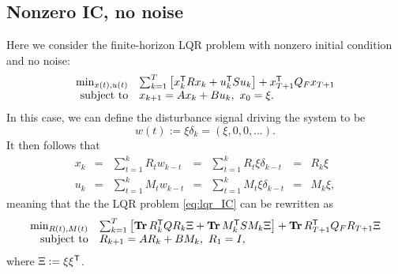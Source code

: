 \documentclass[11pt]{article}
\numberwithin{equation}{section}
\begin{document}
\subsection{Nonzero IC, no noise}
Here we consider the finite-horizon LQR problem with nonzero initial condition and no noise:
\begin{equation}
\begin{array}{rl}
\min_{x(t),u(t)} & \sum_{k=1}^T \left[x_k^{\mathsf{T}} R x_k + u_k^{\mathsf{T}} Su_k\right]+ x_{T+1}^{\mathsf{T}} Q_F x_{T+1}\\
\mbox{subject to} & x_{k+1} = Ax_k + Bu_k, \ x_0 = \xi.
\end{array}
\label{eq:lqr_IC}
\end{equation}
In this case, we can define the disturbance signal driving the system to be 
\begin{equation}
w(t) := \xi \delta_k = (\xi,0,0,\dots).
\end{equation}
It then follows that
\begin{equation}
\begin{array}{rclclcl}
x_k &=& \sum_{t=1}^k R_t w_{k-t} &=& \sum_{t=1}^k R_t \xi \delta_{k-t} &=& R_k \xi \\
u_k &=& \sum_{t=1}^k M_t w_{k-t} &=& \sum_{t=1}^k M_t \xi \delta_{k-t} &=& M_k \xi,
\end{array}
\end{equation}
meaning that the the LQR problem \eqref{eq:lqr_IC} can be rewritten as
\begin{equation}
\begin{array}{rl}
\min_{R(t),M(t)} & \sum_{k=1}^T\left[\operatorname*{\mathbf{Tr}} R_k^{\mathsf{T}} Q R_k\Xi + \operatorname*{\mathbf{Tr}} M_k^{\mathsf{T}} S M_k\Xi\right] +  \operatorname*{\mathbf{Tr}} R_{T+1}^{\mathsf{T}} Q_F R_{T+1}\Xi \\
\mbox{subject to} & R_{k+1} = AR_k + BM_k, \ R_1 = I,
\end{array}
\end{equation}
where $\Xi := \xi \xi^{\mathsf{T}}$.
\end{document}
